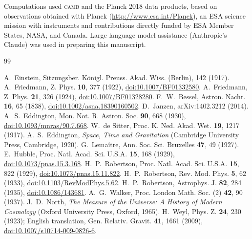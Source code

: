 \documentclass[aps,prd,reprint,amsmath,amssymb,superscriptaddress]{revtex4-2}
\begin{document}
\begin{acknowledgments}
Computations used \textsc{camb} and the Planck 2018 data products, based on observations obtained with Planck (\url{http://www.esa.int/Planck}), an ESA science mission with instruments and contributions directly funded by ESA Member States, NASA, and Canada. Large language model assistance (Anthropic's Claude) was used in preparing this manuscript.
\end{acknowledgments}

\begin{thebibliography}{99}

 A.~Einstein, Sitzungsber. K\"onigl. Preuss. Akad. Wiss. (Berlin), 142 (1917).
 A.~Friedmann, Z. Phys. \textbf{10}, 377 (1922), \href{https://doi.org/10.1007/BF01332580}{doi:10.1007/BF01332580}.
 A.~Friedmann, Z. Phys. \textbf{21}, 326 (1924), \href{https://doi.org/10.1007/BF01328280}{doi:10.1007/BF01328280}.
 F.~W.~Bessel, Astron. Nachr. \textbf{16}, 65 (1838), \href{https://doi.org/10.1002/asna.18390160502}{doi:10.1002/asna.18390160502}.
 D.~Janzen, arXiv:1402.3212 (2014).
 A.~S.~Eddington, Mon. Not. R. Astron. Soc. \textbf{90}, 668 (1930), \href{https://doi.org/10.1093/mnras/90.7.668}{doi:10.1093/mnras/90.7.668}.
 W.~de Sitter, Proc. K. Ned. Akad. Wet. \textbf{19}, 1217 (1917).
 A.~S.~Eddington, \textit{Space, Time and Gravitation} (Cambridge University Press, Cambridge, 1920).
 G.~Lema{\^i}tre, Ann. Soc. Sci. Bruxelles \textbf{47}, 49 (1927).
 E.~Hubble, Proc. Natl. Acad. Sci. U.S.A. \textbf{15}, 168 (1929), \href{https://doi.org/10.1073/pnas.15.3.168}{doi:10.1073/pnas.15.3.168}.
 H.~P.~Robertson, Proc. Natl. Acad. Sci. U.S.A. \textbf{15}, 822 (1929), \href{https://doi.org/10.1073/pnas.15.11.822}{doi:10.1073/pnas.15.11.822}.
 H.~P.~Robertson, Rev. Mod. Phys. \textbf{5}, 62 (1933), \href{https://doi.org/10.1103/RevModPhys.5.62}{doi:10.1103/RevModPhys.5.62}.
 H.~P.~Robertson, Astrophys. J. \textbf{82}, 284 (1935), \href{https://doi.org/10.1086/143681}{doi:10.1086/143681}.
 A.~G.~Walker, Proc. London Math. Soc. (2) \textbf{42}, 90 (1937).
 J.~D.~North, \textit{The Measure of the Universe: A History of Modern Cosmology} (Oxford University Press, Oxford, 1965).
 H.~Weyl, Phys. Z. \textbf{24}, 230 (1923); English translation, Gen. Relativ. Gravit. \textbf{41}, 1661 (2009), \href{https://doi.org/10.1007/s10714-009-0826-6}{doi:10.1007/s10714-009-0826-6}.

\end{thebibliography}
\end{document}
